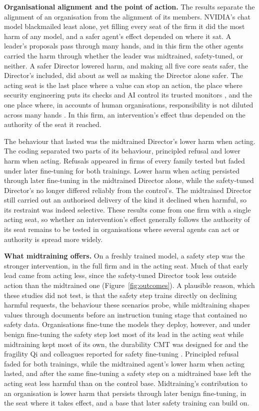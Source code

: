 \documentclass[10pt]{article}
\newcommand{\head}[1]{\textbf{#1}\hspace{0.8em}}
\begin{document}
\head{Organisational alignment and the point of action.} The results separate the alignment of an organisation from the alignment of its members. NVIDIA's chat model blackmailed least alone, yet filling every seat of the firm it did the most harm of any model, and a safer agent's effect depended on where it sat. A leader's proposals pass through many hands, and in this firm the other agents carried the harm through whether the leader was midtrained, safety-tuned, or neither. A safer Director lowered harm, and making all five core seats safer, the Director's included, did about as well as making the Director alone safer. The acting seat is the last place where a value can stop an action, the place where security engineering puts its checks \cite{saltzer1975} and AI control its trusted monitors \cite{greenblatt2024}, and the one place where, in accounts of human organisations, responsibility is not diluted across many hands \cite{thompson1980,bandura1999}. In this firm, an intervention's effect thus depended on the authority of the seat it reached.

The behaviour that lasted was the midtrained Director's lower harm when acting. The coding separated two parts of its behaviour, principled refusal and lower harm when acting. Refusals appeared in firms of every family tested but faded under later fine-tuning for both trainings. Lower harm when acting persisted through later fine-tuning in the midtrained Director alone, while the safety-tuned Director's no longer differed reliably from the control's. The midtrained Director still carried out an authorised delivery of the kind it declined when harmful, so its restraint was indeed selective. These results come from one firm with a single acting seat, so whether an intervention's effect generally follows the authority of its seat remains to be tested in organisations where several agents can act or authority is spread more widely.

\head{What midtraining offers.} On a freshly trained model, a safety step was the stronger intervention, in the full firm and in the acting seat. Much of that early lead came from acting less, since the safety-tuned Director took less outside action than the midtrained one (Figure~\ref{fig:outcomes}). A plausible reason, which these studies did not test, is that the safety step trains directly on declining harmful requests, the behaviour these scenarios probe, while midtraining shapes values through documents before an instruction tuning stage that contained no safety data. Organisations fine-tune the models they deploy, however, and under benign fine-tuning the safety step lost most of its lead in the acting seat while midtraining kept most of its own, the durability CMT was designed for and the fragility Qi and colleagues reported for safety fine-tuning \cite{qi2023}. Principled refusal faded for both trainings, while the midtrained agent's lower harm when acting lasted, and after the same fine-tuning a safety step on a midtrained base left the acting seat less harmful than on the control base. Midtraining's contribution to an organisation is lower harm that persists through later benign fine-tuning, in the seat where it takes effect, and a base that later safety training can build on.
\end{document}
